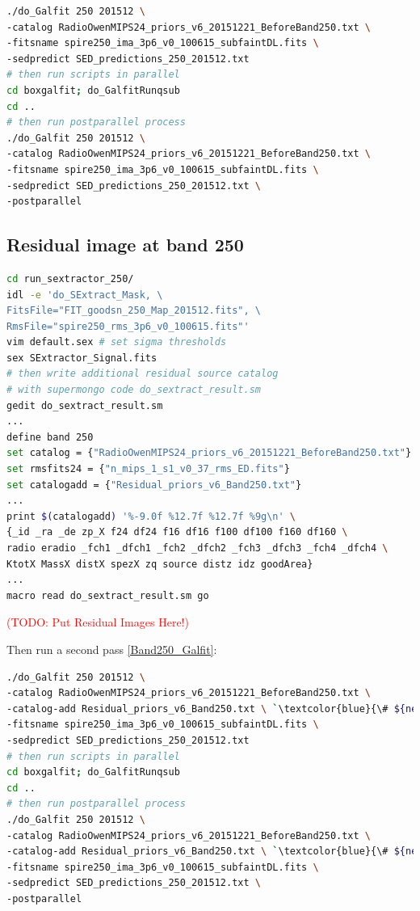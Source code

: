 \documentclass[11pt,a4paper]{article}
\begin{document}
\begin{lstlisting}[language=bash]
./do_Galfit 250 201512 \
-catalog RadioOwenMIPS24_priors_v6_20151221_BeforeBand250.txt \
-fitsname spire250_ima_3p6_v0_100615_subfaintDL.fits \
-sedpredict SED_predictions_250_201512.txt
# then run scripts in parallel 
cd boxgalfit; do_GalfitRunqsub
cd ..
# then run postparallel process
./do_Galfit 250 201512 \
-catalog RadioOwenMIPS24_priors_v6_20151221_BeforeBand250.txt \
-fitsname spire250_ima_3p6_v0_100615_subfaintDL.fits \
-sedpredict SED_predictions_250_201512.txt \
-postparallel
\end{lstlisting}

\subsection{Residual image at band 250}
\label{Band250_Galres}

\begin{lstlisting}[language=bash]
cd run_sextractor_250/
idl -e 'do_SExtract_Mask, \
FitsFile="FIT_goodsn_250_Map_201512.fits", \
RmsFile="spire250_rms_3p6_v0_100615.fits"'
vim default.sex # set sigma thresholds
sex SExtractor_Signal.fits
# then write additional residual source catalog
# with supermongo code do_sextract_result.sm
gedit do_sextract_result.sm
...
define band 250
set catalog = {"RadioOwenMIPS24_priors_v6_20151221_BeforeBand250.txt"}
set rmsfits24 = {"n_mips_1_s1_v0_37_rms_ED.fits"}
set catalogadd = {"Residual_priors_v6_Band250.txt"}
...
print $(catalogadd) '%-9.0f %12.7f %12.7f %9g\n' \
{_id _ra _de zp_X f24 df24 f16 df16 f100 df100 f160 df160 \
radio eradio _fch1 _dfch1 _fch2 _dfch2 _fch3 _dfch3 _fch4 _dfch4 \
KtotX MassX distX spezX zq source distz idz goodArea}
...
macro read do_sextract_result.sm go
\end{lstlisting}

\textcolor{red}{(TODO: Put Residual Images Here!)}

Then run a second pass \ref{Band250_Galfit}: 

\begin{lstlisting}[language=bash]
./do_Galfit 250 201512 \
-catalog RadioOwenMIPS24_priors_v6_20151221_BeforeBand250.txt \
-catalog-add Residual_priors_v6_Band250.txt \ `\textcolor{blue}{\# ${new!}$}`
-fitsname spire250_ima_3p6_v0_100615_subfaintDL.fits \
-sedpredict SED_predictions_250_201512.txt
# then run scripts in parallel 
cd boxgalfit; do_GalfitRunqsub
cd ..
# then run postparallel process
./do_Galfit 250 201512 \
-catalog RadioOwenMIPS24_priors_v6_20151221_BeforeBand250.txt \
-catalog-add Residual_priors_v6_Band250.txt \ `\textcolor{blue}{\# ${new!}$}`
-fitsname spire250_ima_3p6_v0_100615_subfaintDL.fits \
-sedpredict SED_predictions_250_201512.txt \
-postparallel
\end{lstlisting}
\end{document}

